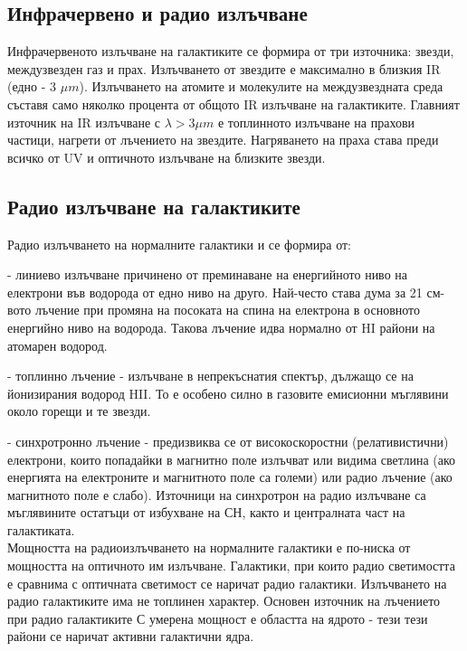 \documentclass[a4paper,12pt]{article}
\begin{document}
\subsection{Инфрачервено и радио излъчване}
Инфрачервеното излъчване на галактиките се формира от три източника: звезди, междузвезден газ и прах. Излъчването от звездите е максимално в близкия IR (едно - 3 $\mu m$). Излъчването на атомите и молекулите на междузвездната среда съставя само няколко процента от общото IR излъчване на галактиките. Главният източник на IR излъчване с $\lambda > 3 \mu m$ е топлинното излъчване на прахови частици, нагрети от лъчението на звездите. Нагряването на праха става преди всичко от UV и оптичното излъчване на близките звезди. 

\subsection{Радио излъчване на галактиките}
Радио излъчването на нормалните галактики и се формира от:

-  линиево излъчване причинено от преминаване на енергийното ниво на електрони във водорода от едно ниво на друго. Най-често става дума за 21 см-вото лъчение при промяна на посоката на спина на електрона в основното енергийно ниво на водорода. Такова лъчение идва нормално от HI райони на атомарен водород.

- топлинно лъчение - излъчване в непрекъснатия спектър, дължащо се на йонизирания водород HII. То е особено силно в газовите емисионни мъглявини около горещи и те звезди.

- синхротронно лъчение - предизвиква се от високоскоростни (релативистични) електрони, които попадайки в магнитно поле излъчват или видима светлина (ако енергията на електроните и магнитното поле са големи) или радио лъчение (ако магнитното поле е слабо). Източници на синхротрон на радио излъчване са мъглявините остатъци от избухване на СН, както и централната част на галактиката.\\

Мощността на радиоизлъчването на нормалните галактики е по-ниска от мощността на оптичното им излъчване. Галактики, при които радио светимостта е сравнима с оптичната светимост се наричат радио галактики. Излъчването на радио галактиките има не топлинен характер. Основен източник на лъчението при радио галактиките С умерена мощност е областта на ядрото - тези тези райони се наричат активни галактични ядра.

\end{document}
